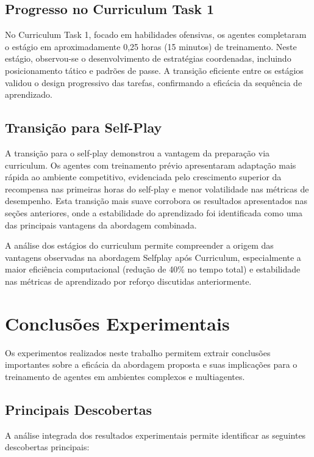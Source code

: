 \subsection{Progresso no Curriculum Task 1}

No Curriculum Task 1, focado em habilidades ofensivas, os agentes completaram o estágio em aproximadamente 0,25 horas (15 minutos) de treinamento. Neste estágio, observou-se o desenvolvimento de estratégias coordenadas, incluindo posicionamento tático e padrões de passe. A transição eficiente entre os estágios validou o design progressivo das tarefas, confirmando a eficácia da sequência de aprendizado.

\subsection{Transição para Self-Play}

A transição para o self-play demonstrou a vantagem da preparação via curriculum. Os agentes com treinamento prévio apresentaram adaptação mais rápida ao ambiente competitivo, evidenciada pelo crescimento superior da recompensa nas primeiras horas do self-play e menor volatilidade nas métricas de desempenho. Esta transição mais suave corrobora os resultados apresentados nas seções anteriores, onde a estabilidade do aprendizado foi identificada como uma das principais vantagens da abordagem combinada.

A análise dos estágios do curriculum permite compreender a origem das vantagens observadas na abordagem Selfplay após Curriculum, especialmente a maior eficiência computacional (redução de 40\% no tempo total) e estabilidade nas métricas de aprendizado por reforço discutidas anteriormente.

\section{Conclusões Experimentais}
\label{sec:conclusoes_experimentais}

Os experimentos realizados neste trabalho permitem extrair conclusões importantes sobre a eficácia da abordagem proposta e suas implicações para o treinamento de agentes em ambientes complexos e multiagentes.

\subsection{Principais Descobertas}

A análise integrada dos resultados experimentais permite identificar as seguintes descobertas principais:

